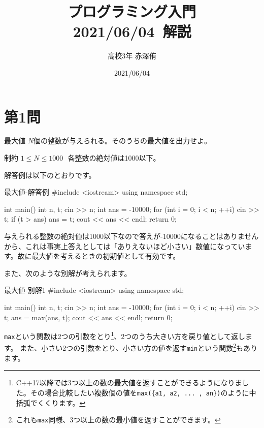 \documentclass[dvipdfmx,a4j,uplatex]{jsarticle}
\title{プログラミング入門\\2021/06/04\ 解説}
\author{高校3年 赤澤侑}
\date{2021/06/04}
\renewcommand{\tt}{\texttt}
\begin{document}
  \maketitle

  \section{第1問}

    \begin{pbox}{最大値}
      $N$個の整数が与えられる。そのうちの最大値を出力せよ。\\
      \begin{cbox}{制約}
        $1 \leq N \leq 1000\ \ \ $各整数の絶対値は1000以下。
      \end{cbox}
    \end{pbox}
    解答例は以下のとおりです。

    \begin{code}{最大値-解答例}
#include <iostream>
using namespace std;

int main(){
    int n, t;
    cin >> n;
    int ans = -10000;
    for (int i = 0; i < n; ++i) {
        cin >> t;
        if (t > ans) {
            ans = t;
        }
    }
    cout << ans << endl;
    return 0;
}
    \end{code}

    与えられる整数の絶対値は1000以下なので答えが-10000になることはありませんから、これは事実上答えとしては「ありえないほど小さい」数値になっています。故に最大値を考えるときの初期値として有効です。

    また、次のような別解が考えられます。
    \newpage

    \begin{code}{最大値-別解1}
#include <iostream>
using namespace std;

int main(){
    int n, t;
    cin >> n;
    int ans = -10000;
    for (int i = 0; i < n; ++i) {
        cin >> t;
        ans = max(ans, t);
    }
    cout << ans << endl;
    return 0;
}
    \end{code}

    \tt{max}という関数は2つの引数をとり\footnote{
      C++17以降では3つ以上の数の最大値を返すことができるようになりました。その場合比較したい複数個の値を\tt{max(\{a1, a2, ... , an\})}のように中括弧でくくります。
    }、2つのうち大きい方を戻り値として返します。
    また、小さい2つの引数をとり、小さい方の値を返す\tt{min}という関数\footnote{
      これも\tt{max}同様、3つ以上の数の最小値を返すことができます。
    }もあります。\\
\end{document}

